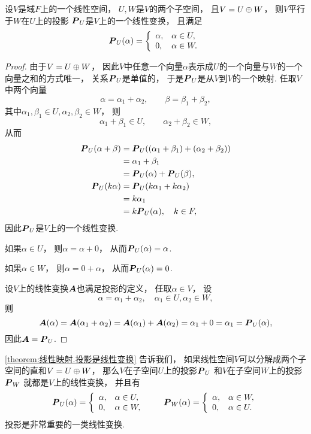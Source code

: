 \begin{theorem}\label{theorem:线性映射.投影是线性变换}
设\(V\)是域\(F\)上的一个线性空间，
\(U,W\)是\(V\)的两个子空间，
且\(V=U \oplus W\)，
则\(V\)平行于\(W\)在\(U\)上的投影
\(\boldsymbol{P}_U\)是\(V\)上的一个线性变换，
且满足\[
	\boldsymbol{P}_U(\alpha)
	=\left\{ \begin{array}{ll}
		\alpha, & \alpha\in U, \\
		0, & \alpha\in W.
	\end{array} \right.
\]
\begin{proof}
由于\(V = U \oplus W\)，
因此\(V\)中任意一个向量\(\alpha\)表示成\(U\)的一个向量与\(W\)的一个向量之和的方式唯一，
关系\(\boldsymbol{P}_U\)是单值的，
于是\(\boldsymbol{P}_U\)是从\(V\)到\(V\)的一个映射.
任取\(V\)中两个向量\[
	\alpha = \alpha_1 + \alpha_2,
	\qquad
	\beta = \beta_1 + \beta_2,
\]
其中\(\alpha_1,\beta_1 \in U,
\alpha_2,\beta_2 \in W\)，
则\[
	\alpha_1 + \beta_1
	\in U,
	\qquad
	\alpha_2 + \beta_2
	\in W,
\]
从而\begin{align*}
	\boldsymbol{P}_U(\alpha + \beta)
	&= \boldsymbol{P}_U((\alpha_1 + \beta_1) + (\alpha_2 + \beta_2)) \\
	&= \alpha_1 + \beta_1 \\
	&= \boldsymbol{P}_U(\alpha) + \boldsymbol{P}_U(\beta), \\
	\boldsymbol{P}_U(k \alpha)
	&= \boldsymbol{P}_U(k \alpha_1 + k \alpha_2) \\
	&= k \alpha_1 \\
	&= k \boldsymbol{P}_U(\alpha),
	\quad k \in F,
\end{align*}
因此\(\boldsymbol{P}_U\)是\(V\)上的一个线性变换.

如果\(\alpha \in U\)，
则\(\alpha = \alpha + 0\)，
从而\(\boldsymbol{P}_U(\alpha) = \alpha\).

如果\(\alpha \in W\)，
则\(\alpha = 0 + \alpha\)，
从而\(\boldsymbol{P}_U(\alpha) = 0\).

设\(V\)上的线性变换\(\boldsymbol{A}\)也满足投影的定义，
任取\(\alpha \in V\)，
设\[
	\alpha = \alpha_1 + \alpha_2,
	\quad
	\alpha_1 \in U,
	\alpha_2 \in W,
\]
则\[
	\boldsymbol{A}(\alpha)
	= \boldsymbol{A}(\alpha_1 + \alpha_2)
	= \boldsymbol{A}(\alpha_1) + \boldsymbol{A}(\alpha_2)
	= \alpha_1 + 0
	= \alpha_1
	= \boldsymbol{P}_U(\alpha),
\]
因此\(\boldsymbol{A} = \boldsymbol{P}_U\).
\end{proof}
\end{theorem}

\cref{theorem:线性映射.投影是线性变换} 告诉我们，
如果线性空间\(V\)可以分解成两个子空间的直和\(V = U \oplus W\)，
那么\(V\)在子空间\(U\)上的投影\(\boldsymbol{P}_U\)
和\(V\)在子空间\(W\)上的投影\(\boldsymbol{P}_W\)
就都是\(V\)上的线性变换，
并且有\begin{equation*}
	\boldsymbol{P}_U(\alpha)
	=\left\{ \begin{array}{ll}
		\alpha, & \alpha\in U, \\
		0, & \alpha\in W,
	\end{array} \right.
	\qquad
	\boldsymbol{P}_W(\alpha)
	=\left\{ \begin{array}{ll}
		\alpha, & \alpha\in W, \\
		0, & \alpha\in U.
	\end{array} \right.
\end{equation*}
投影是非常重要的一类线性变换.

